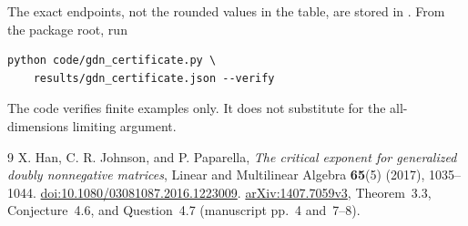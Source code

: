 \documentclass[11pt]{article}
\begin{document}
The exact endpoints, not the rounded values in the table, are stored in . From the package root, run
\begin{verbatim}
python code/gdn_certificate.py \
    results/gdn_certificate.json --verify
\end{verbatim}
The code verifies finite examples only. It does not substitute for the all-dimensions limiting argument.

\begin{thebibliography}{9}
X. Han, C. R. Johnson, and P. Paparella,
\emph{The critical exponent for generalized doubly nonnegative matrices},
Linear and Multilinear Algebra \textbf{65}(5) (2017), 1035--1044.
\href{https://doi.org/10.1080/03081087.2016.1223009}{doi:10.1080/03081087.2016.1223009}.
\href{https://arxiv.org/abs/1407.7059}{arXiv:1407.7059v3}, Theorem~3.3, Conjecture~4.6, and Question~4.7 (manuscript pp.~4 and~7--8).
\end{thebibliography}
\end{document}
